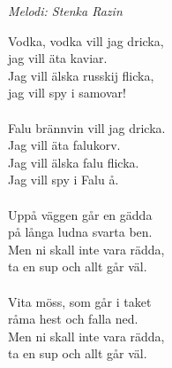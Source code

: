 {\footnotesize\textit{Melodi: Stenka Razin}}\par
\vspace{10pt}
Vodka, vodka vill jag dricka,\\
jag vill äta kaviar.\\
\revrpt Jag vill älska russkij flicka,\\
jag vill spy i samovar!\rpt\\
\\
Falu brännvin vill jag dricka.\\
Jag vill äta falukorv.\\
\revrpt Jag vill älska falu flicka.\\
Jag vill spy i Falu å.\rpt\\
\\
Uppå väggen går en gädda\\
på långa ludna svarta ben.\\
\revrpt Men ni skall inte vara rädda,\\
ta en sup och allt går väl.\rpt\\
\\
Vita möss, som går i taket\\
råma hest och falla ned.\\
\revrpt Men ni skall inte vara rädda,\\
ta en sup och allt går väl.\rpt

